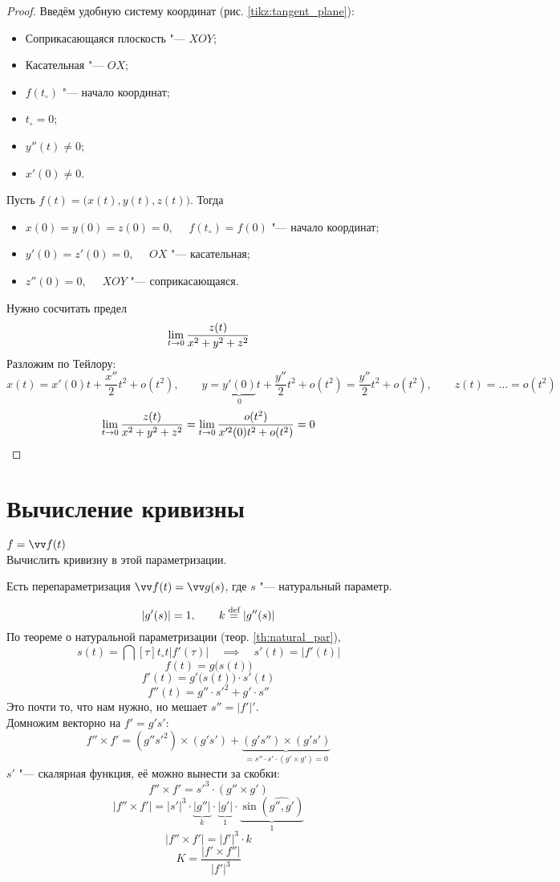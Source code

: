 \begin{proof}
    Введём удобную систему координат (рис. \ref{tikz:tangent_plane}):
    \begin{itemize}
    	\item Соприкасающаяся плоскость "--- $ XOY $;
        \item Касательная "--- $ OX $;
        \item $ f(t_\circ) $ "--- начало координат;
        \item $ t_\circ = 0 $;
        \item $ y''(t) \ne 0 $;
        \item $ x'(0) \ne 0 $.
    \end{itemize}

    Пусть $ f(t) = \bigg( x(t), y(t), z(t) \bigg) $. Тогда
    \begin{itemize}
    	\item $ x(0) = y(0) = z(0) = 0, \quad $ \as $ f(t_\circ) = f(0) $ "--- начало координат;
        \item $ y'(0) = z'(0) = 0, \quad $ \as $ OX $ "--- касательная;
        \item $ z''(0) = 0, \quad $ \as $ XOY $ "--- соприкасающаяся.
    \end{itemize}

    Нужно сосчитать предел
    $$ \lim\limits_{t\to0} \frac{z(t)}{x^2 + y^2 + z^2} $$
    Разложим по Тейлору:
    $$ x(t) = x'(0)t + \frac{x''}2t^2 + o(t^2), \qquad y = \underbrace{y'(0)}_0t + \frac{y''}2t^2 + o(t^2) = \frac{y''}2t^2 + o(t^2), \qquad z(t) = \dots = o(t^2) $$
    $$ \lim\limits_{t\to0} \frac{z(t)}{x^2 + y^2 + z^2} = \lim\limits_{t\to0} \frac{o(t^2)}{x'^2(0)t^2 + o(t^2)} = 0 $$
\end{proof}

\section{Вычисление кривизны}

\begin{problem}
	$ f = \vv f(t) $ \\
    Вычислить кривизну в этой параметризации.
\end{problem}

Есть перепараметризация $ \vv f(t) = \vv g(s) $, где $ s $ "--- натуральный параметр.

$$ | g'(s)| = 1, \qquad k \stackrel{\text{def}}{=} |g''(s)| $$
По теореме о натуральной параметризации (теор. \ref{th:natural_par}),
$$ s(t) = \dint[\tau]{t_\circ}t{|f'(\tau)|} \quad \implies \quad s'(t) = |f'(t)| $$
$$ f(t) = g \big( s(t) \big) $$
$$ f'(t) = g' \big( s(t) \big) \cdot s'(t) $$
$$ f''(t) = g'' \cdot s'^2 + g' \cdot s'' $$
Это почти то, что нам нужно, но мешает $ s'' = |f'|' $. \\
Домножим векторно на $ f' = g's' $:
$$ f'' \times f' = (g''s'^2) \times (g's') + \underbrace{(g's'') \times (g's')}_{= s'' \cdot s' \cdot (g' \times g') = 0} $$
$ s' $ "--- скалярная функция, её можно вынести за скобки:
$$ f'' \times f' = s'^3 \cdot (g'' \times g') $$
$$ |f'' \times f'| = |s'|^3 \cdot \underbrace{|g''|}_k \cdot \underbrace{|g'|}_1 \cdot \underbrace{\sin(\hat{g'', g'})}_1 $$
$$ |f'' \times f'| = |f'|^3 \cdot k $$
$$ \boxed{K = \frac{|f' \times f''|}{|f'|^3}} $$

